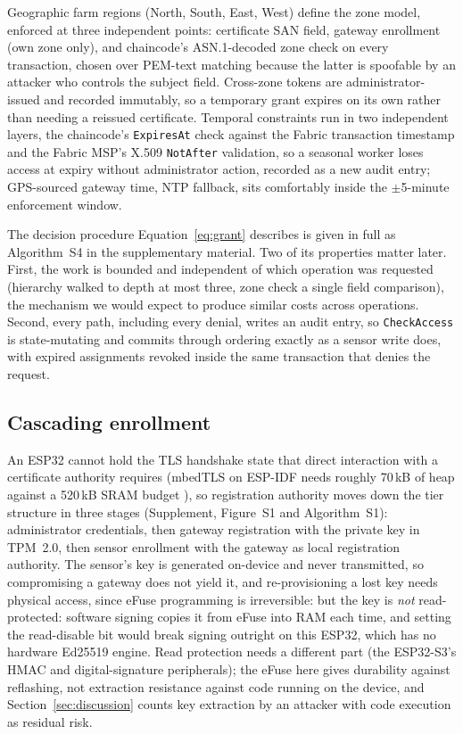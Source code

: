 \documentclass[a4paper,fleqn]{cas-sc}
\begin{document}
Geographic farm regions (North, South, East, West) define the zone model,
enforced at three independent points: certificate SAN field, gateway
enrollment (own zone only), and chaincode's ASN.1-decoded zone check on
every transaction, chosen over PEM-text matching because the latter is
spoofable by an attacker who controls the subject field. Cross-zone
tokens are administrator-issued and recorded immutably, so a temporary
grant expires on its own rather than needing a reissued certificate.
Temporal constraints run in two independent layers, the chaincode's
\texttt{ExpiresAt} check against the Fabric transaction timestamp and the
Fabric MSP's X.509 \texttt{NotAfter} validation, so a seasonal worker
loses access at expiry without administrator action, recorded as a new
audit entry; GPS-sourced gateway time, NTP fallback, sits comfortably
inside the $\pm$5-minute enforcement window.

The decision procedure Equation~\eqref{eq:grant} describes is given in
full as Algorithm~S4 in the supplementary material. Two of its properties
matter later. First, the work is bounded and independent of which
operation was requested (hierarchy walked to depth at most three, zone
check a single field comparison), the mechanism we would expect to produce
similar costs across operations. Second, every path, including every
denial, writes an audit entry, so \texttt{CheckAccess} is state-mutating
and commits through ordering exactly as a sensor write does, with expired
assignments revoked inside the same transaction that denies the request.

\subsection{Cascading enrollment}
\label{subsec:enrollment}

An ESP32 cannot hold the TLS handshake state that direct interaction with a
certificate authority requires (mbedTLS on ESP-IDF needs roughly 70\,kB of
heap against a 520\,kB SRAM budget \cite{raza2013lithe}), so registration
authority moves down the tier structure in three stages (Supplement,
Figure~S1 and Algorithm~S1): administrator credentials, then gateway
registration with the private key in TPM~2.0, then sensor enrollment with
the gateway as local registration authority. The sensor's key is generated
on-device and never transmitted, so compromising a gateway does not yield
it, and re-provisioning a lost key needs physical access, since eFuse
programming is irreversible: but the key is \emph{not} read-protected:
software signing copies it from eFuse into RAM each time, and setting the
read-disable bit would break signing outright on this ESP32, which has no
hardware Ed25519 engine. Read protection needs a different part (the
ESP32-S3's HMAC and digital-signature peripherals); the eFuse here gives
durability against reflashing, not extraction resistance against code
running on the device, and Section~\ref{sec:discussion} counts key
extraction by an attacker with code execution as residual risk.
\end{document}
